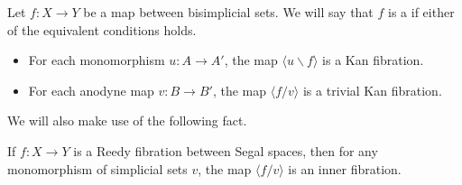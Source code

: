 \documentclass[main.tex]{subfiles}
\begin{document}
\begin{appendix}
  \begin{definition}
    \label{def:reedy_fibration}
    Let $f\colon X \to Y$ be a map between bisimplicial sets. We will say that $f$ is a  if either of the equivalent conditions holds.
    \begin{itemize}
      \item For each monomorphism $u\colon A \to A'$, the map $\langle u \backslash f \rangle$ is a Kan fibration.

      \item For each anodyne map $v\colon B \to B'$, the map $\langle f / v \rangle$ is a trivial Kan fibration.
    \end{itemize}
  \end{definition}
\end{appendix}

We will also make use of the following fact.

\begin{theorem}
  \label{thm:inner_fibration_between_quasicategories}
  If $f\colon X \to Y$ is a Reedy fibration between Segal spaces, then for any monomorphism of simplicial sets $v$, the map $\langle f / v \rangle$ is an inner fibration.
\end{theorem}
\end{document}
